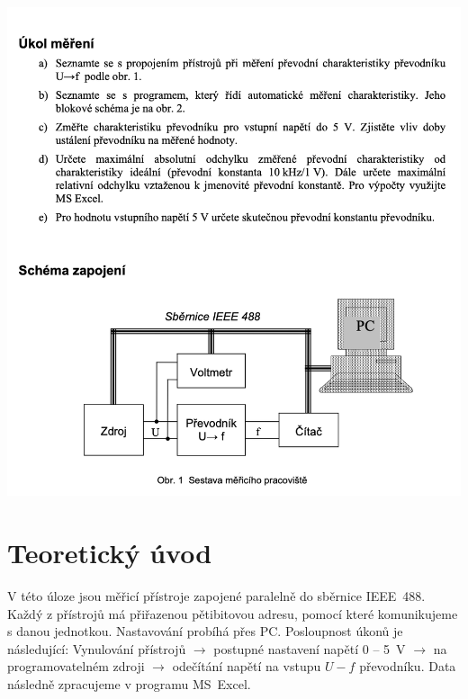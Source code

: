 \documentclass[a4paper,12pt]{article}   %
\begin{document}
\includegraphics[width=\textwidth]{main.png}
\newpage


\section{Teoretický úvod}
\label{chap:teoreticky_uvod}

V této úloze jsou měřicí přístroje zapojené paralelně do sběrnice IEEE~488. Každý z přístrojů má přiřazenou pětibitovou adresu, pomocí které komunikujeme s danou jednotkou. Nastavování probíhá přes PC. Posloupnost úkonů je následující: Vynulování přístrojů $\rightarrow$ postupné nastavení napětí 0 -- 5~V $\rightarrow$ na programovatelném zdroji $\rightarrow$ odečítání napětí na vstupu $U-f$ převodníku. Data následně zpracujeme v programu MS~Excel.
\end{document}
